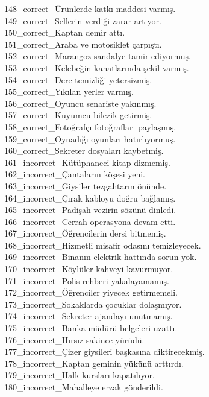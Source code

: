 \begin{myparindent}{0pt}
148\_correct\_Ürünlerde katkı maddesi varmış. \\
149\_correct\_Sellerin verdiği zarar artıyor. \\
150\_correct\_Kaptan demir attı. \\
151\_correct\_Araba ve motosiklet çarpıştı. \\
152\_correct\_Marangoz sandalye tamir ediyormuş. \\
153\_correct\_Kelebeğin kanatlarında şekil varmış. \\
154\_correct\_Dere temizliği yetersizmiş. \\
155\_correct\_Yıkılan yerler varmış. \\
156\_correct\_Oyuncu senariste yakınmış. \\
157\_correct\_Kuyumcu bilezik getirmiş. \\
158\_correct\_Fotoğrafçı fotoğrafları paylaşmış. \\
159\_correct\_Oynadığı oyunları hatırlıyormuş. \\
160\_correct\_Sekreter dosyaları kaybetmiş. \\
161\_incorrect\_Kütüphaneci kitap dizmemiş. \\
162\_incorrect\_Çantaların köşesi yeni. \\
163\_incorrect\_Giysiler tezgahtarın önünde. \\
164\_incorrect\_Çırak kabloyu doğru bağlamış. \\
165\_incorrect\_Padişah vezirin sözünü dinledi. \\
166\_incorrect\_Cerrah operasyona devam etti. \\
167\_incorrect\_Öğrencilerin dersi bitmemiş. \\
168\_incorrect\_Hizmetli misafir odasını temizleyecek. \\
169\_incorrect\_Binanın elektrik hattında sorun yok. \\
170\_incorrect\_Köylüler kahveyi kavurmuyor. \\
171\_incorrect\_Polis rehberi yakalayamamış. \\
172\_incorrect\_Öğrenciler yiyecek getirmemeli. \\
173\_incorrect\_Sokaklarda çocuklar dolaşmıyor. \\
174\_incorrect\_Sekreter ajandayı unutmamış. \\
175\_incorrect\_Banka müdürü belgeleri uzattı. \\
176\_incorrect\_Hırsız sakince yürüdü. \\
177\_incorrect\_Çizer giysileri başkasına diktirecekmiş. \\
178\_incorrect\_Kaptan geminin yükünü arttırdı. \\
179\_incorrect\_Halk kursları kapatılıyor. \\
180\_incorrect\_Mahalleye erzak gönderildi. \\
\end{myparindent}